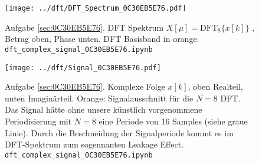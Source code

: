 \begin{figure}
\centering
\texttt{[image: ../dft/DFT\_Spectrum\_0C30EB5E76.pdf]}
\caption{Aufgabe \ref{sec:0C30EB5E76}. DFT Spektrum $X[\mu]=\mathrm{DFT}_8\{x[k]\}$ ,
Betrag oben, Phase unten. DFT Basisband in orange.
\texttt{dft\_complex\_signal\_0C30EB5E76.ipynb}}
\label{fig:DFT_Spectrum_0C30EB5E76}
\end{figure}
%
\begin{figure}
\centering
\texttt{[image: ../dft/Signal\_0C30EB5E76.pdf]}
\caption{Aufgabe \ref{sec:0C30EB5E76}. Komplexe Folge $x[k]$, oben Realteil,
unten Imaginärteil. Orange: Signalausschnitt für die $N=8$ DFT. Das Signal
hätte ohne unsere künstlich vorgenommene Periodisierung mit $N=8$
eine Periode von 16 Samples (siehe graue Linie). Durch die Beschneidung der
Signalperiode kommt es im DFT-Spektrum
 zum sogennanten Leakage Effect.
\texttt{dft\_complex\_signal\_0C30EB5E76.ipynb}}
\label{fig:Signal_0C30EB5E76}
\end{figure}







\clearpage
